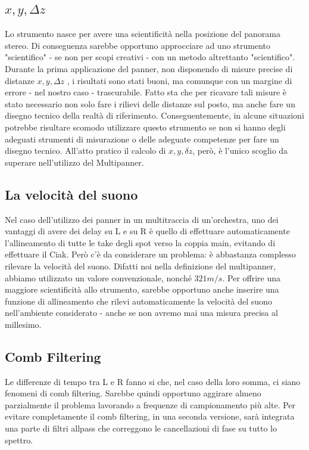 \documentclass{article}
\begin{document}
\subsection{$x, y, \Delta z$}
    Lo strumento nasce per avere una scientificità nella posizione del panorama stereo. Di conseguenza sarebbe opportuno approcciare ad uno strumento "scientifico" - se non per scopi creativi - con un metodo altrettanto "scientifico".
    Durante la prima applicazione del panner, non disponendo di misure precise di distanze $x, y, \Delta z$ , i risultati sono stati buoni, ma comunque con un margine di errore - nel nostro caso - trascurabile.
    Fatto sta che per ricavare tali misure è stato necessario non solo fare i rilievi delle distanze sul posto, ma anche fare un disegno tecnico della realtà di riferimento. Conseguentemente, in alcune situazioni potrebbe risultare scomodo utilizzare questo strumento se non si hanno degli adeguati strumenti di misurazione o delle adeguate competenze per fare un disegno tecnico. All'atto pratico il calcolo di  $x, y, \delta z$, però, è l'unico scoglio da superare nell'utilizzo del Multipanner.

\subsection{La velocità del suono}
    Nel caso dell'utilizzo dei panner in un multitraccia di un'orchestra, uno dei vantaggi di avere dei delay su L e su R è quello di effettuare automaticamente l'allineamento di tutte le take degli spot verso la coppia main, evitando di effettuare il Ciak. Però c'è da considerare un problema: è abbastanza complesso rilevare la velocità del suono. Difatti noi nella definizione del multipanner, abbiamo utilizzato un valore convenzionale, nonché $321 m/s$. Per offrire una maggiore scientificità allo strumento, sarebbe opportuno anche inserire una funzione di allineamento che rilevi automaticamente la velocità del suono nell'ambiente considerato - anche se non avremo mai una misura precisa al millesimo.
    
\subsection{Comb Filtering}
    Le differenze di tempo tra L e R fanno si che, nel caso della loro somma, ci siano fenomeni di comb filtering. Sarebbe quindi opportuno aggirare almeno parzialmente il problema lavorando a frequenze di campionamento più alte. Per evitare completamente il comb filtering, in una seconda versione, sarà integrata una parte di filtri allpass che correggono le cancellazioni di fase su tutto lo spettro.
\end{document}
